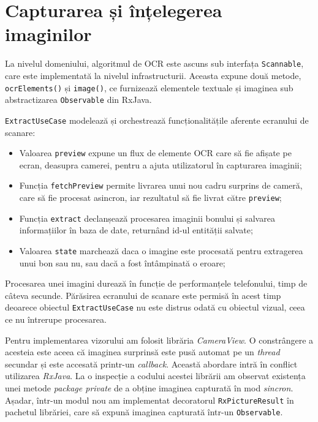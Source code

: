 \section{Capturarea și înțelegerea imaginilor}

La nivelul domeniului, algoritmul de OCR este ascuns sub interfața \texttt{Scannable}, care este implementată la nivelul infrastructurii. Aceasta expune două metode, \texttt{ocrElements()} și \texttt{image()}, ce furnizează elementele textuale și imaginea sub abstractizarea \texttt{Observable} din RxJava.



\texttt{ExtractUseCase} modelează și orchestrează funcționalitățile aferente ecranului de scanare:

\begin{itemize}
  \item 
  Valoarea \texttt{preview} expune un flux de elemente OCR care să fie afișate pe ecran, deasupra camerei, pentru a ajuta utilizatorul în capturarea imaginii;

  \item
  Funcția \texttt{fetchPreview} permite livrarea unui nou cadru surprins de cameră, care să fie procesat asincron, iar rezultatul să fie livrat către \texttt{preview};

  \item
  Funcția \texttt{extract} declanșează procesarea imaginii bonului și salvarea informațiilor în baza de date, returnând id-ul entității salvate;

  \item
  Valoarea \texttt{state} marchează daca o imagine este procesată pentru extragerea unui bon sau nu, sau dacă a fost întâmpinată o eroare;
\end{itemize}

Procesarea unei imagini durează în funcție de performanțele telefonului, timp de câteva secunde. Părăsirea ecranului de scanare este permisă în acest timp deoarece obiectul \texttt{ExtractUseCase} nu este distrus odată cu obiectul vizual, ceea ce nu întrerupe procesarea.

Pentru implementarea vizorului am folosit librăria \emph{CameraView}\cite{CameraView}. O constrângere a acesteia este aceea că imaginea surprinsă este pusă automat pe un \emph{thread} secundar și este accesată printr-un \emph{callback}. Această abordare intră în conflict utilizarea \emph{RxJava}. La o inspecție a codului acestei librării am observat existența unei metode \emph{package private} de a obține imaginea capturată în mod \emph{sincron}. Așadar, într-un modul nou am implementat decoratorul \texttt{RxPictureResult} în pachetul librăriei, care să expună imaginea capturată într-un \texttt{Observable}.

